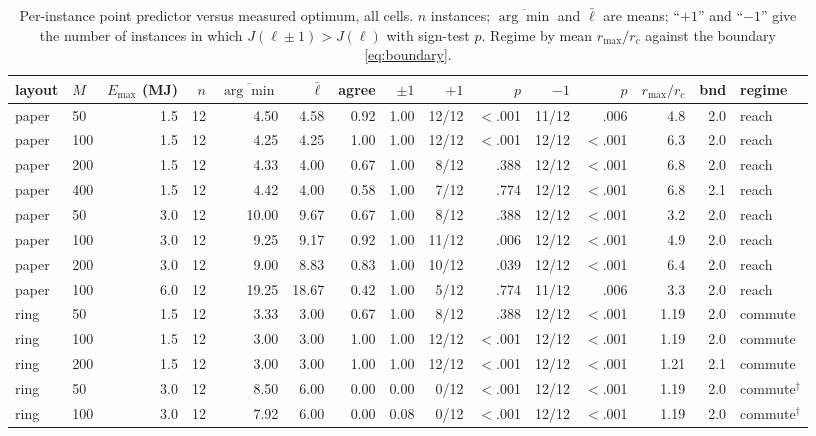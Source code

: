 \documentclass[journal,outdir=./]{IEEEtran}
\newcommand{\rmax}{r_{\max}}
\newcommand{\rc}{r_{c}}
\newcommand{\Emax}{E_{\max}}
\begin{document}
\begin{table}[t]
\small\setlength{\tabcolsep}{4pt}
\centering
\caption{Per-instance point predictor versus measured optimum, all cells. $n$ instances; $\overline{\arg\min}$ and $\bar\ell$ are means; ``$+1$'' and ``$-1$'' give the number of instances in which $J(\ell\pm1)>J(\ell)$ with sign-test $p$. Regime by mean $\rmax/\rc$ against the boundary \eqref{eq:boundary}.}
\label{tab:law}
\begin{tabular}{llrr rrrr rr rr rr l}
\toprule
layout & $M$ & $\Emax$ (MJ) & $n$ & $\overline{\arg\min}$ & $\bar\ell$ & agree & $\pm1$ & $+1$ & $p$ & $-1$ & $p$ & $\rmax/\rc$ & bnd & regime\\
\midrule
paper & 50 & 1.5 & 12 & 4.50 & 4.58 & 0.92 & 1.00 & 12/12 & $<$.001 & 11/12 & .006 & 4.8 & 2.0 & reach\\
paper & 100 & 1.5 & 12 & 4.25 & 4.25 & 1.00 & 1.00 & 12/12 & $<$.001 & 12/12 & $<$.001 & 6.3 & 2.0 & reach\\
paper & 200 & 1.5 & 12 & 4.33 & 4.00 & 0.67 & 1.00 & 8/12 & .388 & 12/12 & $<$.001 & 6.8 & 2.0 & reach\\
paper & 400 & 1.5 & 12 & 4.42 & 4.00 & 0.58 & 1.00 & 7/12 & .774 & 12/12 & $<$.001 & 6.8 & 2.1 & reach\\
paper & 50 & 3.0 & 12 & 10.00 & 9.67 & 0.67 & 1.00 & 8/12 & .388 & 12/12 & $<$.001 & 3.2 & 2.0 & reach\\
paper & 100 & 3.0 & 12 & 9.25 & 9.17 & 0.92 & 1.00 & 11/12 & .006 & 12/12 & $<$.001 & 4.9 & 2.0 & reach\\
paper & 200 & 3.0 & 12 & 9.00 & 8.83 & 0.83 & 1.00 & 10/12 & .039 & 12/12 & $<$.001 & 6.4 & 2.0 & reach\\
paper & 100 & 6.0 & 12 & 19.25 & 18.67 & 0.42 & 1.00 & 5/12 & .774 & 11/12 & .006 & 3.3 & 2.0 & reach\\
\midrule
ring & 50 & 1.5 & 12 & 3.33 & 3.00 & 0.67 & 1.00 & 8/12 & .388 & 12/12 & $<$.001 & 1.19 & 2.0 & commute\\
ring & 100 & 1.5 & 12 & 3.00 & 3.00 & 1.00 & 1.00 & 12/12 & $<$.001 & 12/12 & $<$.001 & 1.19 & 2.0 & commute\\
ring & 200 & 1.5 & 12 & 3.00 & 3.00 & 1.00 & 1.00 & 12/12 & $<$.001 & 12/12 & $<$.001 & 1.21 & 2.1 & commute\\
ring & 50 & 3.0 & 12 & 8.50 & 6.00 & 0.00 & 0.00 & 0/12 & $<$.001 & 12/12 & $<$.001 & 1.19 & 2.0 & commute$^{\dagger}$\\
ring & 100 & 3.0 & 12 & 7.92 & 6.00 & 0.00 & 0.08 & 0/12 & $<$.001 & 12/12 & $<$.001 & 1.19 & 2.0 & commute$^{\dagger}$\\

\end{tabular}
\end{table}
\end{document}
